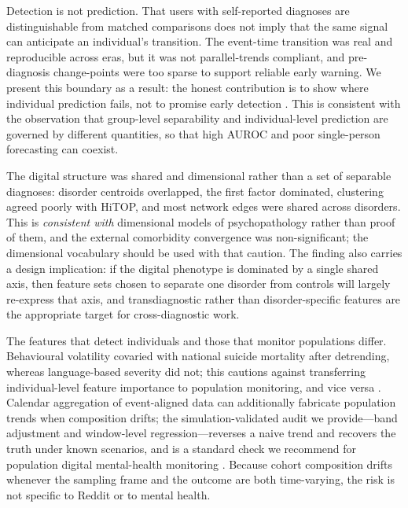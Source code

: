 \documentclass[11pt]{article}
\begin{document}
Detection is not prediction. That users with self-reported diagnoses are distinguishable from matched comparisons
does not imply that the same signal can anticipate an individual's transition. The
event-time transition was real and reproducible across eras, but it was not parallel-trends
compliant, and pre-diagnosis change-points were too sparse to support reliable early warning.
We present this boundary as a result: the honest contribution is to show where individual
prediction fails, not to promise early detection \cite{giampetruzzi2026promise}. This is
consistent with the observation that group-level separability and individual-level prediction
are governed by different quantities, so that high AUROC and poor single-person forecasting can
coexist.

The digital structure was shared and dimensional rather than a set of separable diagnoses:
disorder centroids overlapped, the first factor dominated, clustering agreed poorly with HiTOP,
and most network edges were shared across disorders. This is \emph{consistent with} dimensional
models of psychopathology \cite{caspi2014p,kotov2017hitop} rather than proof of them, and the
external comorbidity convergence was non-significant; the dimensional vocabulary should be
used with that caution. The finding also carries a design implication: if the digital phenotype
is dominated by a single shared axis, then feature sets chosen to separate one disorder from
controls will largely re-express that axis, and transdiagnostic rather than disorder-specific
features are the appropriate target for cross-diagnostic work.

The features that detect individuals and those that monitor populations differ. Behavioural
volatility covaried with national suicide mortality after detrending, whereas language-based
severity did not; this cautions against transferring individual-level feature importance to
population monitoring, and vice versa \cite{shi2026protests,roozenbeek2026protests}. Calendar
aggregation of event-aligned data can additionally fabricate population trends when composition
drifts; the simulation-validated audit we provide---band adjustment and window-level
regression---reverses a naive trend and recovers the truth under known scenarios, and is a
standard check we recommend for population digital mental-health monitoring
\cite{eichstaedt2015heart,brown2018replicationstatements}. Because cohort composition drifts
whenever the sampling frame and the outcome are both time-varying, the risk is not specific to
Reddit or to mental health.
\end{document}
